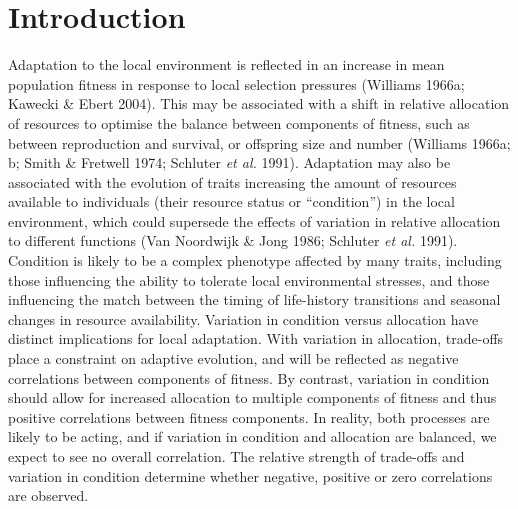 \documentclass[]{article}
\begin{document}
\hypertarget{introduction}{%
\section{Introduction}\label{introduction}}

Adaptation to the local environment is reflected in an increase in mean population fitness in response to local selection pressures (Williams 1966a; Kawecki \& Ebert 2004). This may be associated with a shift in relative allocation of resources to optimise the balance between components of fitness, such as between reproduction and survival, or offspring size and number (Williams 1966a; b; Smith \& Fretwell 1974; Schluter \emph{et al.} 1991). Adaptation may also be associated with the evolution of traits increasing the amount of resources available to individuals (their resource status or ``condition'') in the local environment, which could supersede the effects of variation in relative allocation to different functions (Van Noordwijk \& Jong 1986; Schluter \emph{et al.} 1991). Condition is likely to be a complex phenotype affected by many traits, including those influencing the ability to tolerate local environmental stresses, and those influencing the match between the timing of life-history transitions and seasonal changes in resource availability. Variation in condition versus allocation have distinct implications for local adaptation. With variation in allocation, trade-offs place a constraint on adaptive evolution, and will be reflected as negative correlations between components of fitness. By contrast, variation in condition should allow for increased allocation to multiple components of fitness and thus positive correlations between fitness components. In reality, both processes are likely to be acting, and if variation in condition and allocation are balanced, we expect to see no overall correlation. The relative strength of trade-offs and variation in condition determine whether negative, positive or zero correlations are observed.
\end{document}
